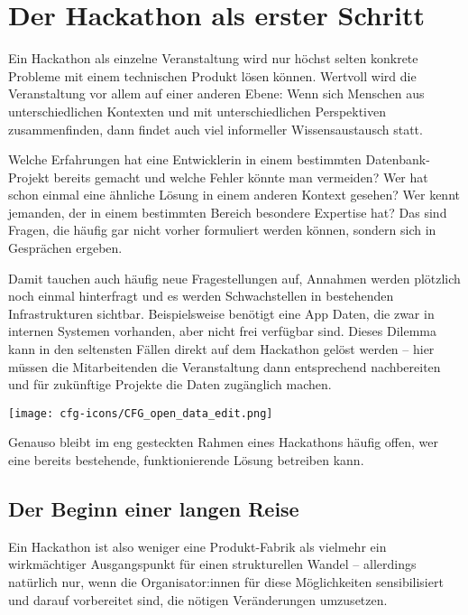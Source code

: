 \chapter{Der Hackathon als erster Schritt}

Ein Hackathon als einzelne Veranstaltung wird nur höchst selten konkrete Probleme mit einem technischen Produkt lösen können. Wertvoll wird die Veranstaltung vor allem auf einer anderen Ebene: Wenn sich Menschen aus unterschiedlichen Kontexten und mit unterschiedlichen Perspektiven zusammenfinden, dann findet auch viel informeller Wissensaustausch statt.

\begin{kaobox}
	Welche Erfahrungen hat eine Entwicklerin in einem bestimmten Datenbank-Projekt bereits gemacht und welche Fehler könnte man vermeiden? Wer hat schon einmal eine ähnliche Lösung in einem anderen Kontext gesehen? Wer kennt jemanden, der in einem bestimmten Bereich besondere Expertise hat? Das sind Fragen, die häufig gar nicht vorher formuliert werden können, sondern sich in Gesprächen ergeben.
\end{kaobox}

Damit tauchen auch häufig neue Fragestellungen auf, Annahmen werden plötzlich noch einmal hinterfragt und es werden Schwachstellen in bestehenden Infrastrukturen sichtbar. Beispielsweise benötigt eine App Daten, die zwar in internen Systemen vorhanden, aber nicht frei verfügbar sind. Dieses Dilemma kann in den seltensten Fällen direkt auf dem Hackathon gelöst werden – hier müssen die Mitarbeitenden die Veranstaltung dann entsprechend nachbereiten und für zukünftige Projekte die Daten zugänglich machen.

\begin{marginfigure}[-5.5cm]
	\texttt{[image: cfg-icons/CFG\_open\_data\_edit.png]}
\end{marginfigure}


Genauso bleibt im eng gesteckten Rahmen eines Hackathons häufig offen, wer eine bereits bestehende, funktionierende Lösung betreiben kann.

\section*{Der Beginn einer langen Reise}

Ein Hackathon ist also weniger eine Produkt-Fabrik als vielmehr ein wirkmächtiger Ausgangspunkt für einen strukturellen Wandel – allerdings natürlich nur, wenn die Organisator:innen für diese Möglichkeiten sensibilisiert und darauf vorbereitet sind, die nötigen Veränderungen umzusetzen.

